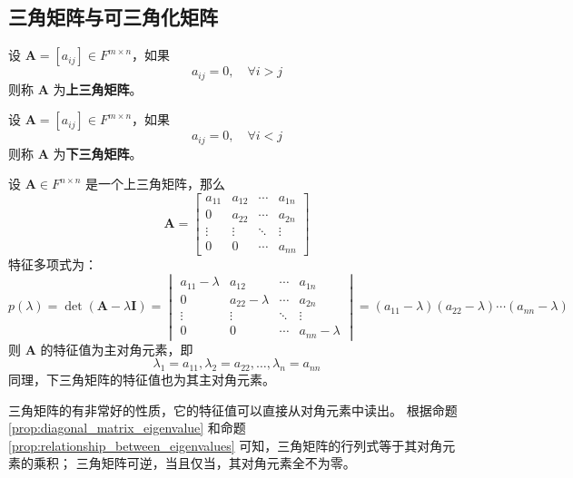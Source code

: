 \subsection{三角矩阵与可三角化矩阵}
\begin{definition}
    设 $\mathbf{A} = [a_{ij}] \in F^{m \times n}$，如果
    \[
        a_{ij} = 0, \quad \forall i > j
    \]
    则称 $\mathbf{A}$ 为\textbf{上三角矩阵}。
    \label{def:upper_triangular_matrix}
\end{definition}

\begin{definition}
    设 $\mathbf{A} = [a_{ij}] \in F^{m \times n}$，如果
    \[
        a_{ij} = 0, \quad \forall i < j
    \]
    则称 $\mathbf{A}$ 为\textbf{下三角矩阵}。
    \label{def:lower_triangular_matrix}
\end{definition}

\begin{proposition}[三角矩阵的主对角元素即为它的特征值]
    设 $\mathbf{A} \in F^{n \times n}$ 是一个上三角矩阵，那么
    \[
        \mathbf{A} = \begin{bmatrix}
            a_{11} & a_{12} & \cdots & a_{1n} \\
            0 & a_{22} & \cdots & a_{2n} \\
            \vdots & \vdots & \ddots & \vdots \\
            0 & 0 & \cdots & a_{nn}
        \end{bmatrix}
    \]
    特征多项式为：
    \[
        p(\lambda) = \det(\mathbf{A} - \lambda \mathbf{I}) = \begin{vmatrix}
            a_{11} - \lambda & a_{12} & \cdots & a_{1n} \\
            0 & a_{22} - \lambda & \cdots & a_{2n} \\
            \vdots & \vdots & \ddots & \vdots \\
            0 & 0 & \cdots & a_{nn} - \lambda
        \end{vmatrix} = (a_{11} - \lambda)(a_{22} - \lambda) \cdots (a_{nn} - \lambda)
    \]
    则 $\mathbf{A}$ 的特征值为主对角元素，即
    \[
        \lambda_1 = a_{11}, \lambda_2 = a_{22}, \ldots, \lambda_n = a_{nn}
    \]
    同理，下三角矩阵的特征值也为其主对角元素。
    \label{prop:triangular_matrix_eigenvalue}
\end{proposition}

\begin{note}
    三角矩阵的有非常好的性质，它的特征值可以直接从对角元素中读出。
    根据命题 \ref{prop:diagonal_matrix_eigenvalue} 和命题 \ref{prop:relationship_between_eigenvalues} 可知，三角矩阵的行列式等于其对角元素的乘积；
    三角矩阵可逆，当且仅当，其对角元素全不为零。
\end{note}

